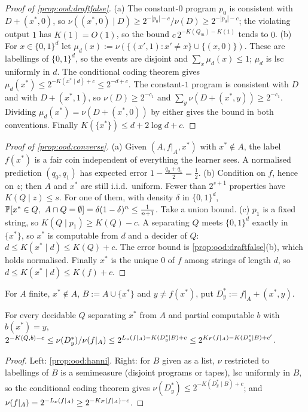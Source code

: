 \begin{proof}[Proof of \cref{prop:ood:draftfalse}]
(a) The constant-$0$ program $p_0$ is consistent with $D+(x^*,0)$, so $\nu((x^*,0)\mid D)\ge2^{-|p_0|-c}/\nu(D)\ge2^{-|p_0|-c}$; the violating output $1$ has $K(1)=O(1)$, so the bound $c\,2^{-K(Q_m)-K(1)}$ tends to $0$.
(b) For $x\in\{0,1\}^d$ let $\mu_d(x):=\nu(\{(x',1):x'\ne x\}\cup\{(x,0)\})$. These are labellings of $\{0,1\}^d$, so the events are disjoint and $\sum_x\mu_d(x)\le1$; $\mu_d$ is lsc uniformly in $d$. The conditional coding theorem gives $\mu_d(x^*)\le2^{-K(x^*\mid d)+c}\le2^{-d+c}$. The constant-$1$ program is consistent with $D$ and with $D+(x^*,1)$, so $\nu(D)\ge2^{-c_1}$ and $\sum_y\nu(D+(x^*,y))\ge2^{-c_1}$. Dividing $\mu_d(x^*)=\nu(D+(x^*,0))$ by either gives the bound in both conventions. Finally $K(\{x^*\})\le d+2\log d+c$.
\end{proof}

\begin{proof}[Proof of \cref{prop:ood:converse}]
(a) Given $(A,f|_A,x^*)$ with $x^*\notin A$, the label $f(x^*)$ is a fair coin independent of everything the learner sees. A normalised prediction $(q_0,q_1)$ has expected error $1-\frac{q_0+q_1}2=\frac12$.
(b) Condition on $f$, hence on $z$; then $A$ and $x^*$ are still i.i.d.\ uniform. Fewer than $2^{s+1}$ properties have $K(Q\mid z)\le s$. For one of them, with density $\delta$ in $\{0,1\}^d$, $\mathbb{P}[x^*\in Q,\ A\cap Q=\emptyset]=\delta(1-\delta)^n\le\frac1{n+1}$. Take a union bound.
(c) $p_1$ is a fixed string, so $K(Q\mid p_1)\ge K(Q)-c$. A separating $Q$ meets $\{0,1\}^d$ exactly in $\{x^*\}$, so $x^*$ is computable from $d$ and a decider of $Q$: $d\le K(x^*\mid d)\le K(Q)+c$. The error bound is \cref{prop:ood:draftfalse}(b), which holds normalised. Finally $x^*$ is the unique $0$ of $f$ among strings of length $d$, so $d\le K(x^*\mid d)\le K(f)+c$.
\end{proof}

For $A$ finite, $x^*\notin A$, $B:=A\cup\{x^*\}$ and $y\ne f(x^*)$, put $D^*_y:=f|_A+(x^*,y)$.

\begin{proposition}\label{prop:ood:sandwich}
For every decidable $Q$ separating $x^*$ from $A$ and partial computable $b$ with $b(x^*)=y$,
$2^{-K(Q,b)-c}\le\nu(D^*_y)/\nu(f|_A)\le2^{L_\nu(f|_A)-K(D^*_y\mid B)+c}\le2^{K_{F}(f|_A)-K(D^*_y\mid B)+c'}$.
\end{proposition}

\begin{proof}
Left: \cref{prop:ood:hanni}. Right: for $B$ given as a list, $\nu$ restricted to labellings of $B$ is a semimeasure (disjoint programs or tapes), lsc uniformly in $B$, so the conditional coding theorem gives $\nu(D^*_y)\le2^{-K(D^*_y\mid B)+c}$; and $\nu(f|_A)=2^{-L_\nu(f|_A)}\ge2^{-K_{F}(f|_A)-c}$.
\end{proof}

